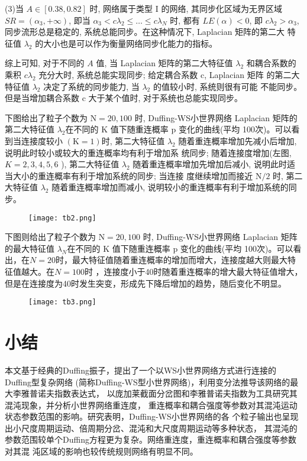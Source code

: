 (3)当 $A \in[0.38,0.82]$ 时, 网络属于类型 $\mathrm{I}$ 的网络, 其同步化区域为无界区域 $S R=\left(\alpha_3,+\infty\right)$,
即当 $\alpha_3<c \lambda_2 \leq \ldots \leq c \lambda_N$ 时, 都有 $L E(\alpha)<0$, 即 $c \lambda_2>\alpha_3$,
同步流形总是稳定的, 系统总能同步。在这种情况下, Laplacian 矩阵的第二大 特征值 $\lambda_2$ 的大小也是可以作为衡量网络同步化能力的指标。\par

综上可知, 对于不同的 $A$ 值, 当 Laplacian 矩阵的第二大特征值 $\lambda_2$ 和耦合系数的乘积 $c \lambda_2$ 充分大时,
系统总能实现同步; 给定耦合系数 $\mathrm{c}$, Laplacian 矩阵 的第二大特征值 $\lambda_2$ 决定了系统的同步能力,
当 $\lambda_2$ 的值较小时, 系统则很有可能 不能同步。但是当增加耦合系数 $\mathrm{c}$ 大于某个值时, 对于系统也总能实现同步。

下图给出了粒子个数为 $\mathrm{N}=20,100$ 时, Duffing-WS小世界网络 Laplacian 矩阵的第二大特征值 $\lambda_2$在不同的 $\mathrm{K}$ 值下随重连概率 $\mathrm{p}$
变化的曲线(平均 100次)。可以看到当连接度较小 $(\mathrm{K}=1)$时, 第二大特征值 $\lambda_2$ 随着重连概率增加先减小后增加,
说明此时较小或较大的重连概率均有利于增加系 统同步; 随着连接度增加(左图, $K=2,3,4,5,6$ ), 第二大特征值 $\lambda_2$
随着重连概率增加先增加后减小, 说明此时适当大小的重连概率有利于增加系统的同步; 当连接 度继续增加而接近 $\mathrm{N} / 2$ 时,
第二大特征值 $\lambda_2$ 随着重连概率增加而减小, 说明较小的重连概率有利于增加系统的同步。\par
\begin{figure}[!htbp]
    \centering
    \texttt{[image: tb2.png]}
\end{figure}
下图则给出了粒子个数为 $\mathrm{N}=20,100$ 时, Duffing-WS小世界网络 Laplacian 矩阵的最大特征值 $\lambda_N$在不同的 $\mathrm{K}$ 值下随重连概率 $\mathrm{p}$
变化的曲线(平均 100次)。可以看出，在$N=20$时，最大特征值随着重连概率的增加而增大，连接度越大则最大特征值越大。在$N=100$时
，连接度小于40时随着重连概率的增大最大特征值增大，但是在连接度为40时发生突变，形成先下降后增加的趋势，随后变化不明显。
\begin{figure}[!htbp]
    \centering
    \texttt{[image: tb3.png]}
\end{figure}
\section{小结} 
本文基于经典的Duffing振子，提出了一个以WS小世界网络方式进行连接的Duffing型复杂网络
(简称Duffing-WS型小世界网络)，利用变分法推导该网络的最大李雅普诺夫指数表达式，
以庞加莱截面分岔图和李雅普诺夫指数为工具研究其混沌现象，并分析小世界网络重连度，
重连概率和耦合强度等参数对其混沌运动状态参数范围的影响。研究表明，Duffing-WS小世界网络的各
个粒子输出也呈现出小尺度周期运动、倍周期分岔、混沌和大尺度周期运动等多种状态，
其混沌的参数范围较单个Duffing方程更为复杂。网络重连度，重连概率和耦合强度等参数对其混
沌区域的影响也较传统规则网络有明显不同。